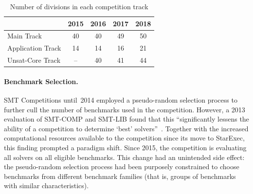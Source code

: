\documentclass[dvipsnames,table,twoside,11pt]{article}
\newcommand{\maintrack}{Main Track\xspace}
\newcommand{\apptrack}{Application Track\xspace}
\newcommand{\ucoretrack}{Unsat-Core Track\xspace}
\begin{document}
\begin{table}
  \caption{Number of divisions in each competition track}
  \label{table:divisions}
  \centering
  \begin{tabular}{lcccc}
    \toprule
    & 2015 & 2016 & 2017 & 2018 \\
    \midrule
    \maintrack   &  40 & 40 & 49 & 50 \\
    \apptrack    &  14 & 14 & 16 & 21 \\
    \ucoretrack  &  -- & 40 & 41 & 44 \\
    \bottomrule
  \end{tabular}
\end{table}

\paragraph{Benchmark Selection.}
SMT Competitions until~2014 employed a pseudo-random selection process
to further cull the number of benchmarks used in the competition.
However, a 2013 evaluation of SMT-COMP and SMT-LIB found that this
``significantly lessens the ability of a competition to determine
`best' solvers''~\cite{CSW15}. Together with the increased
computational resources available to the competition since its move to
StarExec, this finding prompted a paradigm shift.  Since 2015, the
competition is evaluating all solvers on all eligible benchmarks.
This change had an unintended side effect: the pseudo-random selection
process had been purposely constrained to choose benchmarks from
different benchmark families (that is, groups of benchmarks with
similar characteristics).
\end{document}
